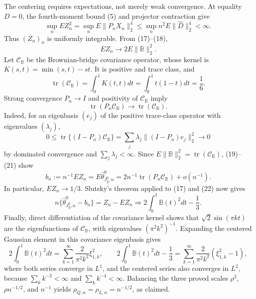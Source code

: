 The centering requires expectations, not merely weak convergence. At equality \(D=0\), the fourth-moment bound (5) and projector contraction give
\[
\sup_n E Z_n^2
=\sup_nE\|P_nX_n\|_2^4
\le\sup_n n^2E\|\widehat D\|_2^4<\infty. \tag{18}
\]
Thus \((Z_n)_n\) is uniformly integrable. From (17)--(18),
\[
EZ_n\longrightarrow2E\|\mathbb B\|_2^2. \tag{19}
\]
Let \(\mathcal C_{\mathbb B}\) be the Brownian-bridge covariance operator, whose kernel is \(K(s,t)=\min(s,t)-st\). It is positive and trace class, and
\[
\operatorname{tr}(\mathcal C_{\mathbb B})
=\int_0^1K(t,t)dt
=\int_0^1t(1-t)dt=\frac16. \tag{20}
\]
Strong convergence \(P_n\to I\) and positivity of \(\mathcal C_{\mathbb B}\) imply
\[
\operatorname{tr}(P_n\mathcal C_{\mathbb B})\to
\operatorname{tr}(\mathcal C_{\mathbb B}). \tag{21}
\]
Indeed, for an eigenbasis \((e_j)\) of the positive trace-class operator with eigenvalues \((\lambda_j)\),
\[
0\le\operatorname{tr}\{(I-P_n)\mathcal C_{\mathbb B}\}
=\sum_j\lambda_j\|(I-P_n)e_j\|_2^2\to0
\]
by dominated convergence and \(\sum_j\lambda_j<\infty\). Since \(E\|\mathbb B\|_2^2=\operatorname{tr}(\mathcal C_{\mathbb B})\), (19)--(21) show
\[
b_n:=n^{-1}EZ_n=E\widehat\theta^0_{J_y^0,n}
=2n^{-1}\operatorname{tr}(P_n\mathcal C_{\mathbb B})+o(n^{-1}). \tag{22}
\]
In particular, \(EZ_n\to1/3\). Slutsky's theorem applied to (17) and (22) now gives
\[
n\{\widehat\theta^0_{J_y^0,n}-b_n\}
=Z_n-EZ_n
\Rightarrow2\int_0^1\mathbb B(t)^2dt-\frac13. \tag{23}
\]
Finally, direct differentiation of the covariance kernel shows that \(\sqrt2\sin(\pi kt)\) are the eigenfunctions of \(\mathcal C_{\mathbb B}\), with eigenvalues \((\pi^2k^2)^{-1}\). Expanding the centered Gaussian element in this covariance eigenbasis gives
\[
2\int_0^1\mathbb B(t)^2dt
=\sum_{k=1}^{\infty}\frac{2}{\pi^2k^2}\xi_{1,k}^2,
\qquad
2\int_0^1\mathbb B(t)^2dt-\frac13
=\sum_{k=1}^{\infty}\frac{2}{\pi^2k^2}(\xi_{1,k}^2-1), \tag{24}
\]
where both series converge in \(L^1\), and the centered series also converges in \(L^2\), because \(\sum_k k^{-2}<\infty\) and \(\sum_k k^{-4}<\infty\). Balancing the three proved scales \(\rho^2\), \(\rho n^{-1/2}\), and \(n^{-1}\) yields \(\rho_{Q,n}=\rho_{L,n}=n^{-1/2}\), as claimed.